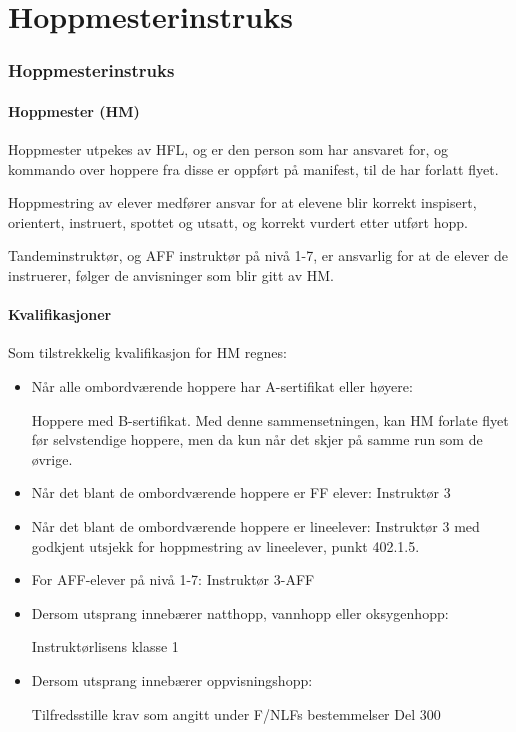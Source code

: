 \part{Hoppmesterinstruks}
\setcounter{section}{507}

\section{Hoppmesterinstruks}
\subsection{Hoppmester (HM)}
Hoppmester utpekes av HFL, og er den person som har ansvaret for, og kommando over hoppere fra disse er oppført på manifest, til de har forlatt flyet.

Hoppmestring av elever medfører ansvar for at elevene blir korrekt inspisert, orientert, instruert, spottet og utsatt, og korrekt vurdert etter utført hopp.

Tandeminstruktør, og AFF instruktør på nivå 1-7, er ansvarlig for at de elever de instruerer, følger de anvisninger som blir gitt av HM.

\subsection{Kvalifikasjoner}
Som tilstrekkelig kvalifikasjon for HM regnes:
\begin{itemize}
	\item Når alle ombordværende hoppere har A-sertifikat eller høyere:

	Hoppere med B-sertifikat. Med denne sammensetningen, kan HM forlate flyet før selvstendige hoppere, men da kun når det skjer på samme run som de øvrige.

	\item Når det blant de ombordværende hoppere er FF elever: Instruktør 3
	\item Når det blant de ombordværende hoppere er lineelever: Instruktør 3 med godkjent utsjekk for hoppmestring av lineelever, punkt 402.1.5.
	\item For AFF-elever på nivå 1-7: Instruktør 3-AFF
	\item Dersom utsprang innebærer natthopp, vannhopp eller oksygenhopp:

	Instruktørlisens klasse 1
	\item Dersom utsprang innebærer oppvisningshopp:

	Tilfredsstille krav som angitt under F/NLFs bestemmelser Del 300
\end{itemize}

